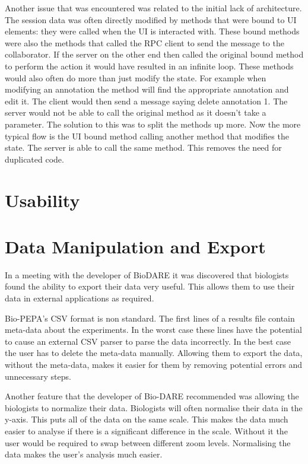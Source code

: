 Another issue that was encountered was related to the initial lack of architecture.  The session data was often directly modified by methods that were bound to \ac{UI} elements: they were called when the \ac{UI} is interacted with.  These bound methods were also the methods that called the \ac{RPC} client to send the message to the collaborator. If the server on the other end then called the original bound method to perform the action it would have resulted in an infinite loop.  These methods would also often do more than just modify the state. For example when modifying an annotation the method will find the appropriate annotation and edit it.  The client would then send a message saying delete annotation 1.  The server would not be able to call the original method as it doesn't take a parameter.  The solution to this was to split the methods up more.  Now the more typical flow is the \ac{UI} bound method calling another method that modifies the state.  The server is able to call the same method.  This removes the need for duplicated code.

\section{Usability}


\section{Data Manipulation and Export}
\label{sec:normalised}

In a meeting with the developer of BioDARE it was discovered that biologists found the ability to export their data very useful.  This allows them to use their data in external applications as required.

Bio-PEPA's CSV format is non standard.  The first lines of a results file contain meta-data about the experiments.  In the worst case these lines have the potential to cause an external CSV parser to parse the data incorrectly.  In the best case the user has to delete the meta-data manually.  Allowing them to export the data, without the meta-data, makes it easier for them by removing potential errors and unnecessary steps.

Another feature that the developer of Bio-DARE recommended was allowing the biologists to normalize their data.  Biologists will often normalise their data in the y-axis.  This puts all of the data on the same scale.  This makes the data much easier to analyse if there is a significant difference in the scale.  Without it the user would be required to swap between different zoom levels.  Normalising the data makes the user's analysis much easier.

